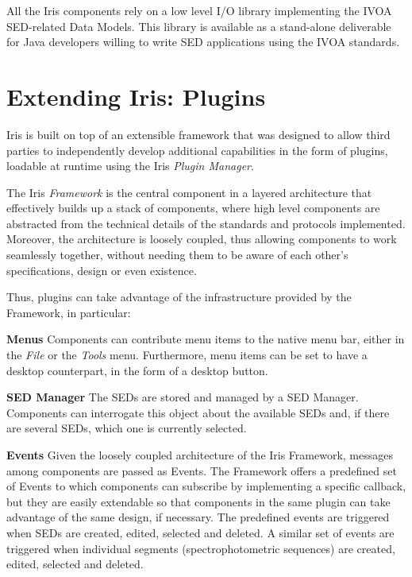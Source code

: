 All the Iris components rely on a low level I/O library implementing the IVOA SED-related Data Models. This library is available as a stand-alone deliverable for Java developers willing to write SED applications using the IVOA standards.

\section{Extending Iris: Plugins}
Iris is built on top of an extensible framework that was designed to allow third parties to independently develop additional capabilities in the form of plugins, loadable at runtime using the Iris \emph{Plugin Manager}.

The Iris \emph{Framework} is the central component in a layered architecture that effectively builds up a stack of components, where high level components are abstracted from the technical details of the standards and protocols implemented. Moreover, the architecture is loosely coupled, thus allowing components to work seamlessly together, without needing them to be aware of each other's specifications, design or even existence.

Thus, plugins can take advantage of the infrastructure provided by the Framework, in particular:

\textbf{Menus}
Components can contribute menu items to the native menu bar, either in the \emph{File} or the \emph{Tools} menu. Furthermore, menu items can be set to have a desktop counterpart, in the form of a desktop button.

\textbf{SED Manager}
The SEDs are stored and managed by a SED Manager. Components can interrogate this object about the available SEDs and, if there are several SEDs, which one is currently selected.

\textbf{Events}
Given the loosely coupled architecture of the Iris Framework, messages among components are passed as Events. The Framework offers a predefined set of Events to which components can subscribe by implementing a specific callback, but they are easily extendable so that components in the same plugin can take advantage of the same design, if necessary. The predefined events are triggered when SEDs are created, edited, selected and deleted. A similar set of events are triggered when individual segments (spectrophotometric sequences) are created, edited, selected and deleted.

